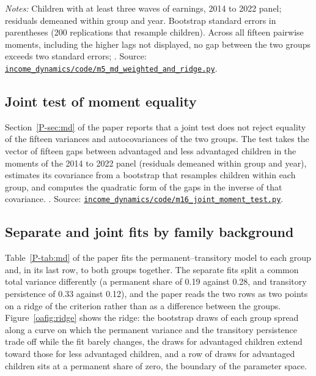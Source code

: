 \documentclass[11pt]{article}
\numberwithin{equation}{section}
\newcommand{\repourl}{https://github.com/JiachenJin1001/before-the-labor-market-or-inside-it}
\newcommand{\code}[1]{\href{\repourl/blob/main/#1}{\nolinkurl{#1}}}
\begin{document}
\begin{table}[H]
\centering
\small
\caption{Empirical autocovariances of residual log earnings, pooled and by group.}
\label{oatab:autocov}

\par\smallskip
\begin{minipage}{0.9\textwidth}
\footnotesize\emph{Notes:} Children with at least three waves of earnings, 2014 to 2022 panel; residuals demeaned within group and year. Bootstrap standard errors in parentheses (200 replications that resample children). Across all fifteen pairwise moments, including the higher lags not displayed, no gap between the two groups exceeds two standard errors; . Source:
\code{income_dynamics/code/m5_md_weighted_and_ridge.py}.
\end{minipage}
\end{table}

\subsection{Joint test of moment equality}
\label{oa:jointtest}

Section~\ref{P-sec:md} of the paper reports that a joint test does not
reject equality of the fifteen variances and autocovariances of the two
groups. The test takes the vector of fifteen gaps between advantaged
and less advantaged children in the moments of the 2014 to 2022 panel
(residuals demeaned within group and year), estimates its covariance
from a bootstrap that resamples children within each group, and computes the quadratic form of the gaps in the inverse of that covariance.
. Source:
\code{income_dynamics/code/m16_joint_moment_test.py}.

\subsection{Separate and joint fits by family background}
\label{oa:jointfit}

Table~\ref{P-tab:md} of the paper fits the permanent--transitory model to each group and, in its last row, to both groups together. The separate fits split a common total variance differently (a permanent share of 0.19 against 0.28, and transitory persistence of 0.33 against 0.12), and the paper reads the two rows as two points on a ridge of the criterion rather than as a difference between the groups. Figure~\ref{oafig:ridge} shows the ridge: the bootstrap draws of each group spread along a curve on which the permanent variance and the transitory persistence trade off while the fit barely changes, the draws for advantaged children extend toward those for less advantaged children, and a row of draws for advantaged children sits at a permanent share of zero, the boundary of the parameter space.
\end{document}
